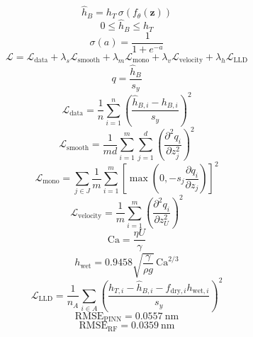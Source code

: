 \documentclass{article}
\begin{document}
\[\hat{h}_B = h_T\,\sigma\!\left(f_\theta(\mathbf{z})\right)\]
\[0 \leq \hat{h}_B \leq h_T\]
\[\sigma(a)=\frac{1}{1+e^{-a}}\]
\[\mathcal{L}=\mathcal{L}_{\mathrm{data}}+\lambda_s\mathcal{L}_{\mathrm{smooth}}+\lambda_m\mathcal{L}_{\mathrm{mono}}+\lambda_v\mathcal{L}_{\mathrm{velocity}}+\lambda_h\mathcal{L}_{\mathrm{LLD}}\]
\[q=\frac{\hat{h}_B}{s_y}\]
\[\mathcal{L}_{\mathrm{data}}=\frac{1}{n}\sum_{i=1}^{n}\left(\frac{\hat{h}_{B,i}-h_{B,i}}{s_y}\right)^2\]
\[\mathcal{L}_{\mathrm{smooth}}=\frac{1}{md}\sum_{i=1}^{m}\sum_{j=1}^{d}\left(\frac{\partial^2 q_i}{\partial z_j^2}\right)^2\]
\[\mathcal{L}_{\mathrm{mono}}=\sum_{j\in J}\frac{1}{m}\sum_{i=1}^{m}\left[\max\!\left(0,-s_j\frac{\partial q_i}{\partial z_j}\right)\right]^2\]
\[\mathcal{L}_{\mathrm{velocity}}=\frac{1}{m}\sum_{i=1}^{m}\left(\frac{\partial^2 q_i}{\partial z_U^2}\right)^2\]
\[\mathrm{Ca}=\frac{\eta U}{\gamma}\]
\[h_{\mathrm{wet}}=0.9458\sqrt{\frac{\gamma}{\rho g}}\,\mathrm{Ca}^{2/3}\]
\[\mathcal{L}_{\mathrm{LLD}}=\frac{1}{n_A}\sum_{i\in A}\left(\frac{h_{T,i}-\hat{h}_{B,i}-f_{\mathrm{dry},i}h_{\mathrm{wet},i}}{s_y}\right)^2\]
\[\mathrm{RMSE}_{\mathrm{PINN}}=0.0557\ \mathrm{nm}\]
\[\mathrm{RMSE}_{\mathrm{RF}}=0.0359\ \mathrm{nm}\]
\end{document}
